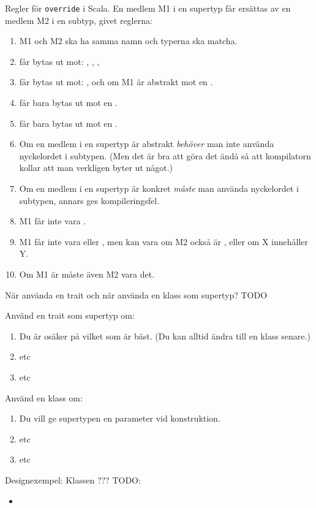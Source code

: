 \begin{Slide}{Regler för \texttt{override} i Scala.} \fontsize{8}{11}\selectfont
\label{slideW07:overriderules}
En medlem M1 i en supertyp får ersättas av en medlem M2 i en subtyp, givet reglerna:
\begin{enumerate}
\item M1 och M2 ska ha samma namn och typerna ska matcha.
\item {} får bytas ut mot: , , , 
\item {} får bytas ut mot: , och om M1 är abstrakt mot en .
\item {} får bara bytas ut mot en .
\item {} får bara bytas ut mot en .
\item Om en medlem i en supertyp är abstrakt \emph{behöver} man inte använda nyckelordet  i subtypen. (Men det är bra att göra det ändå så att kompilatorn kollar att man verkligen byter ut något.) 
\item Om en medlem i en supertyp är konkret \emph{måste} man använda nyckelordet  i subtypen, annars ges kompileringsfel.
\item M1 får inte vara .
\item M1 får inte vara  eller , men kan vara  om M2 också är , eller  om X innehåller Y.   
\item Om M1 är  måste även M2 vara det.

\end{enumerate}
\end{Slide}


\begin{Slide}{När använda en trait och när använda en klass som supertyp?} 
\fontsize{9}{11}\selectfont
\label{slideW07:traitorclass}
TODO
\begin{multicols}{2}
Använd en trait som supertyp om:
\begin{enumerate}
\item Du är osäker på vilket som är bäst. (Du kan alltid ändra till en klass senare.)
\item etc
\item etc
\end{enumerate}

\columnbreak

Använd en klass om:
\begin{enumerate}
\item Du vill ge supertypen en parameter vid konstruktion.
\item etc
\item etc
\end{enumerate}


\end{multicols}
\end{Slide}



\begin{Slide}{Designexempel: Klassen ???}\small
TODO:
  \begin{itemize} 
  \item 
  \end{itemize}
\end{Slide}










